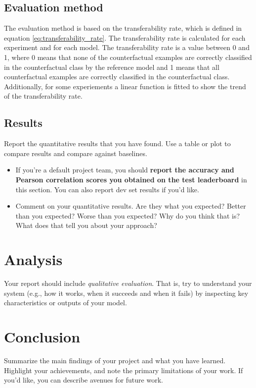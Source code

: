 \documentclass{article}
\begin{document}
\subsection{Evaluation method}
The evaluation method is based on the transferability rate, which is defined in equation \ref{eq:transferability_rate}. The transferability rate is calculated for each experiment and for each model. The transferability rate is a value between 0 and 1, where 0 means that none of the counterfactual examples are correctly classified in the counterfactual class by the reference model and 1 means that all counterfactual examples are correctly classified in the counterfactual class. \\
Additionally, for some experiements a linear function is fitted to show the trend of the transferability rate. 

\subsection{Results}
Report the quantitative results that you have found. Use a table or plot to compare results and compare against baselines.
\begin{itemize}
    \item If you're a default project team, you should \textbf{report the accuracy and Pearson correlation scores you obtained on the test leaderboard} in this section. You can also report dev set results if you'd like. 
    \item Comment on your quantitative results. Are they what you expected? Better than you expected? Worse than you expected? Why do you think that is? What does that tell you about your approach?
\end{itemize}

\section{Analysis}
Your report should include \textit{qualitative evaluation}. That is, try to understand your system (e.g., how it works, when it succeeds and when it fails) by inspecting key characteristics or outputs of your model.

\section{Conclusion}
Summarize the main findings of your project and what you have learned. Highlight your achievements, and note the primary limitations of your work. If you'd like, you can describe avenues for future work.
\end{document}
